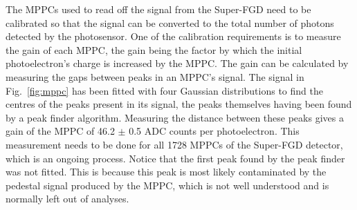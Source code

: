 \documentclass[aps,pra,12pt,notitlepage,tightenlines]{revtex4-1}
\begin{document}
The MPPCs used to read off the signal from the Super-FGD need to be calibrated so that the signal can be converted to the total number of photons detected by the photosensor. One of the calibration requirements is to measure the gain of each MPPC, the gain being the factor by which the initial photoelectron's charge is increased by the MPPC. The gain can be calculated by measuring the gaps between peaks in an MPPC's signal. The signal in Fig.~\ref{fig:mppc} has been fitted with four Gaussian distributions to find the centres of the peaks present in its signal, the peaks themselves having been found by a peak finder algorithm. Measuring the distance between these peaks gives a gain of the MPPC of 46.2 $\pm$ 0.5 ADC counts per photoelectron. This measurement needs to be done for all 1728 MPPCs of the Super-FGD detector, which is an ongoing process. Notice that the first peak found by the peak finder was not fitted. This is because this peak is most likely contaminated by the pedestal signal produced by the MPPC, which is not well understood and is normally left out of analyses.
\end{document}
